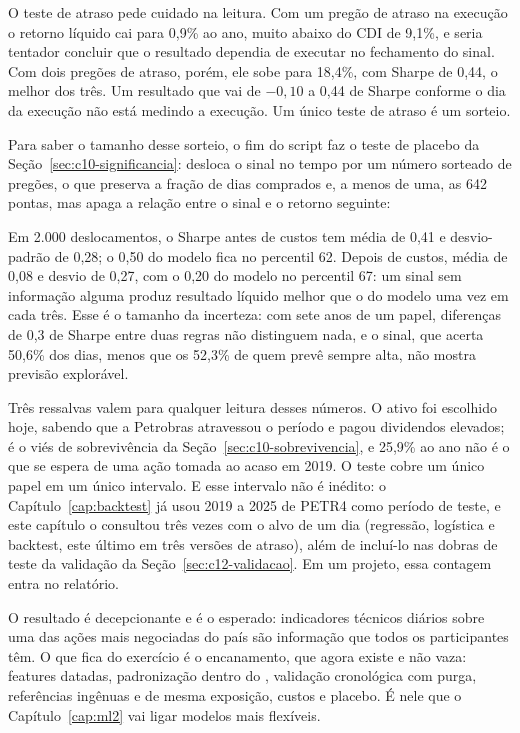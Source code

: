 O teste de atraso pede cuidado na leitura. Com um pregão de atraso na execução o retorno líquido cai para 0,9\% ao ano, muito abaixo do CDI de 9,1\%, e seria tentador concluir que o resultado dependia de executar no fechamento do sinal. Com dois pregões de atraso, porém, ele sobe para 18,4\%, com Sharpe de 0,44, o melhor dos três. Um resultado que vai de $-0,10$ a 0,44 de Sharpe conforme o dia da execução não está medindo a execução. Um único teste de atraso é um sorteio.

Para saber o tamanho desse sorteio, o fim do script faz o teste de placebo da Seção~\ref{sec:c10-significancia}: desloca o sinal no tempo por um número sorteado de pregões, o que preserva a fração de dias comprados e, a menos de uma, as 642 pontas, mas apaga a relação entre o sinal e o retorno seguinte:



Em 2.000 deslocamentos, o Sharpe antes de custos tem média de 0,41 e desvio-padrão de 0,28; o 0,50 do modelo fica no percentil 62. Depois de custos, média de 0,08 e desvio de 0,27, com o 0,20 do modelo no percentil 67: um sinal sem informação alguma produz resultado líquido melhor que o do modelo uma vez em cada três. Esse é o tamanho da incerteza: com sete anos de um papel, diferenças de 0,3 de Sharpe entre duas regras não distinguem nada, e o sinal, que acerta 50,6\% dos dias, menos que os 52,3\% de quem prevê sempre alta, não mostra previsão explorável.

Três ressalvas valem para qualquer leitura desses números. O ativo foi escolhido hoje, sabendo que a Petrobras atravessou o período e pagou dividendos elevados; é o viés de sobrevivência da Seção~\ref{sec:c10-sobrevivencia}, e 25,9\% ao ano não é o que se espera de uma ação tomada ao acaso em 2019. O teste cobre um único papel em um único intervalo. E esse intervalo não é inédito: o Capítulo~\ref{cap:backtest} já usou 2019 a 2025 de PETR4 como período de teste, e este capítulo o consultou três vezes com o alvo de um dia (regressão, logística e backtest, este último em três versões de atraso), além de incluí-lo nas dobras de teste da validação da Seção~\ref{sec:c12-validacao}. Em um projeto, essa contagem entra no relatório.

O resultado é decepcionante e é o esperado: indicadores técnicos diários sobre uma das ações mais negociadas do país são informação que todos os participantes têm. O que fica do exercício é o encanamento, que agora existe e não vaza: features datadas, padronização dentro do , validação cronológica com purga, referências ingênuas e de mesma exposição, custos e placebo. É nele que o Capítulo~\ref{cap:ml2} vai ligar modelos mais flexíveis.

